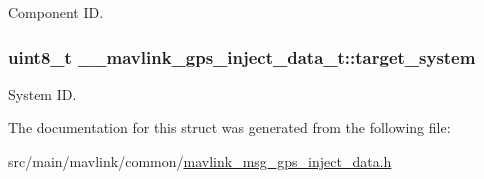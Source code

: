 Component I\+D. 

\hypertarget{struct____mavlink__gps__inject__data__t_a8388c4f011ef1eb68bd7ebd0c2f1c69b}{
\subsubsection[{target\+\_\+system}]{\setlength{\rightskip}{0pt plus 5cm}uint8\+\_\+t \+\_\+\+\_\+mavlink\+\_\+gps\+\_\+inject\+\_\+data\+\_\+t\+::target\+\_\+system}}\label{struct____mavlink__gps__inject__data__t_a8388c4f011ef1eb68bd7ebd0c2f1c69b}


System I\+D. 



The documentation for this struct was generated from the following file\+:\begin{DoxyCompactItemize}
\item 
src/main/mavlink/common/\hyperlink{mavlink__msg__gps__inject__data_8h}{mavlink\+\_\+msg\+\_\+gps\+\_\+inject\+\_\+data.\+h}\end{DoxyCompactItemize}
